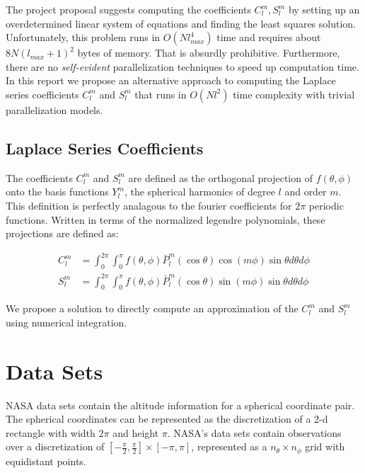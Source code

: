 \documentclass[a4paper]{article}
\theoremstyle{definition}
\begin{document}
The project proposal suggests computing the coefficients $C_l^m, S_l^m$ by setting up an overdetermined linear system of equations and finding the least squares
solution. Unfortunately, this problem runs in $O(Nl_{max}^4)$ time and requires about $8N(l_{max} + 1)^2$ bytes of memory. That is absurdly prohibitive. Furthermore, there 
are no \textit{self-evident} parallelization techniques to speed up computation time. In this report we propose an alternative approach to computing the Laplace series coefficients
$C_l^m$ and $S_l^m$ that runs in \textbf{$O(Nl^2)$} time complexity with trivial parallelization models.

\subsection{Laplace Series Coefficients}

The coefficients $C_l^m$ and $S_l^m$ are defined as the orthogonal projection of $f(\theta, \phi)$ onto the basis functions $Y_l^m$, 
the spherical harmonics of degree $l$ and order $m$. This definition is perfectly analagous to the fourier coefficients for $2\pi$ 
periodic functions. Written in terms of the normalized legendre polynomials, these projections are defined as:

\begin{align*}
    \label{eq:coeff}
    C_l^m &= \int_0^{2\pi}\int_0^\pi f(\theta, \phi) \bar P_l^m (\cos \theta)\cos (m \phi) \sin \theta d\theta d\phi\\
    S_l^m &= \int_0^{2\pi}\int_0^\pi f(\theta, \phi) \bar P_l^m (\cos \theta)\sin (m \phi) \sin \theta d\theta d\phi 
\end{align*}

We propose a solution to directly compute an approximation of the $C_l^m$ and $S_l^m$ using numerical integration.


\section{Data Sets}

NASA data sets contain the altitude information for a spherical coordinate pair. The spherical coordinates can
be represented as the discretization of a 2-d rectangle with width $2\pi$ and height $\pi$. NASA's data sets contain observations
over a discretization of $[-\frac{\pi}{2}, \frac{\pi}{2}] \times [-\pi, \pi]$, represented as a $n_\theta \times n_\phi$ grid with equidistant points.
\end{document}
